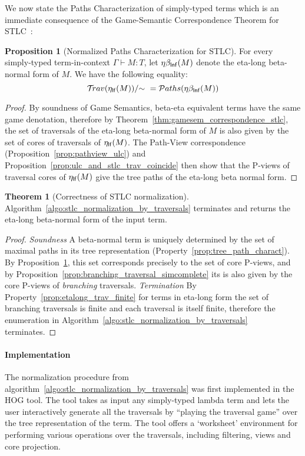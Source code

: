 \documentclass{article}
\theoremstyle{definition}
\newtheorem{proposition}{Proposition}[section]
\newtheorem{theorem}{Theorem}[section]
\newcommand{\travulc}{\travset}
\newcommand\pathset{{\mathcal{P}aths}} %
\begin{document}
We now state the Paths Characterization of simply-typed terms which is an immediate consequence of the Game-Semantic Correspondence Theorem for STLC~\cite{BlumPhd}:
\begin{proposition}[Normalized Paths Characterization for STLC]
\label{prop:path_charact_stlc}
For every simply-typed term-in-context $\Gamma\vdash M :T$, let $\eta\beta_{\sf lnf}(M)$ denote the eta-long beta-normal form of $M$. We have the following equality:
\begin{equation*}
\travulc(\etalf{M})/{\sim}\ = \pathset(\etabetalnf{M})
\end{equation*}
\end{proposition}
\begin{proof}
 By soundness of Game Semantics, beta-eta equivalent terms have the same game denotation, therefore by Theorem~\ref{thm:gamesem_correspondence_stlc}, the set of traversals of the eta-long beta-normal form of $M$ is also given by the set of cores of traversals of $\eta_{\sf lf}(M)$. The Path-View correspondence (Proposition~\ref{prop:pathview_ulc}) and Proposition~\ref{prop:ulc_and_stlc_trav_coincide} then show that the P-views of traversal cores of $\eta_{\sf lf}(M)$ give the tree paths of the eta-long beta normal form.
\end{proof}



\begin{theorem}[Correctness of STLC normalization]
Algorithm~\ref{algo:stlc_normalization_by_traversals} terminates and returns the eta-long beta-normal form of the input term.
\end{theorem}
\begin{proof}
\emph{Soundness} A beta-normal term is uniquely determined by the set of maximal paths in its tree representation (Property~\ref{prop:tree_path_charact}). By Proposition~\ref{prop:path_charact_stlc}, this set corresponds precisely to the set of core P-views,
and by Proposition~\ref{prop:branching_traversal_simcomplete} its is also given by the core P-views of \emph{branching} traversals.
\emph{Termination} By Property~\ref{prop:etalong_trav_finite} for terms in eta-long form the set of branching traversals is finite and each traversal is itself finite, therefore the enumeration in Algorithm~\ref{algo:stlc_normalization_by_traversals} terminates.
\end{proof}


\paragraph{Implementation} The normalization procedure from algorithm~\ref{algo:stlc_normalization_by_traversals} was first implemented in the HOG tool\cite{BlumGalop2008, BlumPhd}. The tool takes as input any simply-typed lambda term and lets the user interactively generate all the traversals by ``playing the traversal game'' over the tree representation of the term. The tool offers a `worksheet' environment for performing various operations over the traversals, including filtering, views and core projection.
\end{document}
